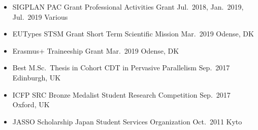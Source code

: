 \begin{itemize}
\item 
  \cvevent
  {SIGPLAN PAC Grant}
  {Professional Activities Grant}
  {Jul.\ 2018, Jan.\ 2019, Jul.\ 2019}
  {Various}
\item
  \cvevent
  {EUTypes STSM Grant}
  {Short Term Scientific Mission}
  {Mar.\ 2019}
  {Odense, DK}
\item
  \cvevent
  {Erasmus+ Traineeship Grant}
  {}
  {Mar.\ 2019}
  {Odense, DK}
\item
  \cvevent
  {Best M.Sc.\ Thesis in Cohort}
  {CDT in Pervasive Parallelism}
  {Sep.\ 2017}
  {Edinburgh, UK}
\item
  \cvevent
  {ICFP SRC Bronze Medalist}
  {Student Research Competition}
  {Sep.\ 2017}
  {Oxford, UK}
\item
  \cvevent
  {JASSO Scholarship}
  {Japan Student Services Organization}
  {Oct.\ 2011}
  {Kyto}
\end{itemize}

